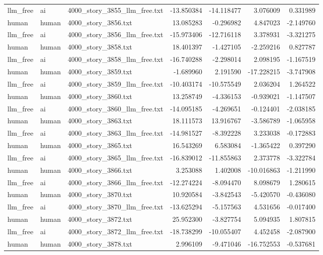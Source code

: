 \begin{longtable}{lllrrrr}
llm\_free & ai & 4000\_story\_3855\_llm\_free.txt & -13.850384 & -14.118477 & 3.076009 & 0.331989 \\
human & human & 4000\_story\_3856.txt & 13.085283 & -0.296982 & 4.847023 & -2.149760 \\
llm\_free & ai & 4000\_story\_3856\_llm\_free.txt & -15.973406 & -12.716118 & 3.378931 & -3.321275 \\
human & human & 4000\_story\_3858.txt & 18.401397 & -1.427105 & -2.259216 & 0.827787 \\
llm\_free & ai & 4000\_story\_3858\_llm\_free.txt & -16.740288 & -2.298014 & 2.098195 & -1.167519 \\
human & human & 4000\_story\_3859.txt & -1.689960 & 2.191590 & -17.228215 & -3.747908 \\
llm\_free & ai & 4000\_story\_3859\_llm\_free.txt & -10.403174 & -10.575549 & 2.036204 & 1.264522 \\
human & human & 4000\_story\_3860.txt & 13.258749 & -4.336153 & -0.939021 & -1.147507 \\
llm\_free & ai & 4000\_story\_3860\_llm\_free.txt & -14.095185 & -4.269651 & -0.124401 & -2.038185 \\
human & human & 4000\_story\_3863.txt & 18.111573 & 13.916767 & -3.586789 & -1.065958 \\
llm\_free & ai & 4000\_story\_3863\_llm\_free.txt & -14.981527 & -8.392228 & 3.233038 & -0.172883 \\
human & human & 4000\_story\_3865.txt & 16.543269 & 6.583084 & -1.365422 & 0.397290 \\
llm\_free & ai & 4000\_story\_3865\_llm\_free.txt & -16.839012 & -11.855863 & 2.373778 & -3.322784 \\
human & human & 4000\_story\_3866.txt & 3.253088 & 1.402008 & -10.016863 & -1.211990 \\
llm\_free & ai & 4000\_story\_3866\_llm\_free.txt & -12.274224 & -8.094470 & 8.098679 & 1.280615 \\
human & human & 4000\_story\_3870.txt & 10.920584 & -3.842543 & -5.420570 & -0.436080 \\
llm\_free & ai & 4000\_story\_3870\_llm\_free.txt & -13.625294 & -5.157563 & 4.531656 & -0.017400 \\
human & human & 4000\_story\_3872.txt & 25.952300 & -3.827754 & 5.094935 & 1.807815 \\
llm\_free & ai & 4000\_story\_3872\_llm\_free.txt & -18.738299 & -10.055407 & 4.452458 & -2.087900 \\
human & human & 4000\_story\_3878.txt & 2.996109 & -9.471046 & -16.752553 & -0.537681 \\

\end{longtable}
